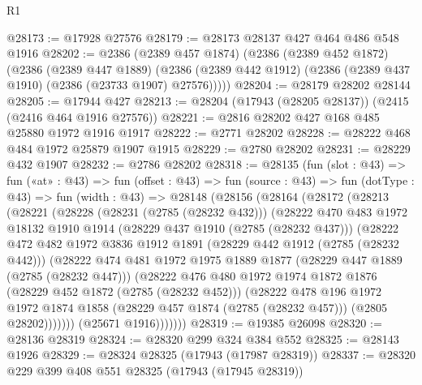 \begin{lexlean}{R1}
\begin{coremodule}
@28173 := @17928 @27576
@28179 := @28173 @28137 @427 @464 @486 @548 @1916
@28202 := @2386
    (@2389 @457 @1874)
    (@2386
      (@2389 @452 @1872)
      (@2386
        (@2389 @447 @1889)
        (@2386 (@2389 @442 @1912) (@2386 (@2389 @437 @1910) (@2386 (@23733 @1907) @27576)))))
@28204 := @28179 @28202 @28144
@28205 := @17944 @427
@28213 := @28204 (@17943 (@28205 @28137)) (@2415 (@2416 @464 @1916 @27576))
@28221 := @2816 @28202 @427 @168 @485 @25880 @1972 @1916 @1917
@28222 := @2771 @28202
@28228 := @28222 @468 @484 @1972 @25879 @1907 @1915
@28229 := @2780 @28202
@28231 := @28229 @432 @1907
@28232 := @2786 @28202
@28318 := @28135
    (fun (slot : @43) =>
    fun («at» : @43) =>
    fun (offset : @43) =>
    fun (source : @43) =>
    fun (dotType : @43) =>
    fun (width : @43) =>
    @28148
      (@28156
        (@28164
          (@28172
            (@28213
              (@28221
                (@28228
                  (@28231 (@2785 (@28232 @432)))
                  (@28222
                    @470
                    @483
                    @1972
                    @18132
                    @1910
                    @1914
                    (@28229 @437 @1910 (@2785 (@28232 @437)))
                    (@28222
                      @472
                      @482
                      @1972
                      @3836
                      @1912
                      @1891
                      (@28229 @442 @1912 (@2785 (@28232 @442)))
                      (@28222
                        @474
                        @481
                        @1972
                        @1975
                        @1889
                        @1877
                        (@28229 @447 @1889 (@2785 (@28232 @447)))
                        (@28222
                          @476
                          @480
                          @1972
                          @1974
                          @1872
                          @1876
                          (@28229 @452 @1872 (@2785 (@28232 @452)))
                          (@28222
                            @478
                            @196
                            @1972
                            @1972
                            @1874
                            @1858
                            (@28229 @457 @1874 (@2785 (@28232 @457)))
                            (@2805 @28202)))))))
                (@25671 @1916)))))))
@28319 := @19385 @26098
@28320 := @28136 @28319
@28324 := @28320 @299 @324 @384 @552
@28325 := @28143 @1926
@28329 := @28324 @28325 (@17943 (@17987 @28319))
@28337 := @28320 @229 @399 @408 @551 @28325 (@17943 (@17945 @28319))

\end{coremodule}
\end{lexlean}
